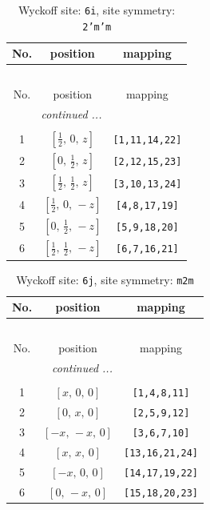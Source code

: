 \documentclass[fleqn,8pt]{jsarticle}
\begin{document}
\renewcommand{\arraystretch}{1.2}
\begin{longtable}{ccc}
\caption{Wyckoff site: {\tt 6i}, site symmetry: {\tt 2'm'm}}
 \\
 \hline \hline
No. & position & mapping \\ \hline \endfirsthead

\multicolumn{2}{l}{\tablename\ \thetable{}} \\
 \hline \hline
No. & position & mapping \\ \hline \endhead

 \hline \hline
\multicolumn{2}{r}{\footnotesize\it continued ...} \\ \endfoot

 \hline \hline
\multicolumn{2}{r}{} \\ \endlastfoot

1 & $\left[ \frac{1}{2},\, 0,\, z \right]$ & {\tt [1,11,14,22]} \\ \hline
2 & $\left[ 0,\, \frac{1}{2},\, z \right]$ & {\tt [2,12,15,23]} \\ \hline
3 & $\left[ \frac{1}{2},\, \frac{1}{2},\, z \right]$ & {\tt [3,10,13,24]} \\ \hline
4 & $\left[ \frac{1}{2},\, 0,\, - z \right]$ & {\tt [4,8,17,19]} \\ \hline
5 & $\left[ 0,\, \frac{1}{2},\, - z \right]$ & {\tt [5,9,18,20]} \\ \hline
6 & $\left[ \frac{1}{2},\, \frac{1}{2},\, - z \right]$ & {\tt [6,7,16,21]} \\
\end{longtable}
\renewcommand{\arraystretch}{1.2}
\begin{longtable}{ccc}
\caption{Wyckoff site: {\tt 6j}, site symmetry: {\tt m2m}}
 \\
 \hline \hline
No. & position & mapping \\ \hline \endfirsthead

\multicolumn{2}{l}{\tablename\ \thetable{}} \\
 \hline \hline
No. & position & mapping \\ \hline \endhead

 \hline \hline
\multicolumn{2}{r}{\footnotesize\it continued ...} \\ \endfoot

 \hline \hline
\multicolumn{2}{r}{} \\ \endlastfoot

1 & $\left[ x,\, 0,\, 0 \right]$ & {\tt [1,4,8,11]} \\ \hline
2 & $\left[ 0,\, x,\, 0 \right]$ & {\tt [2,5,9,12]} \\ \hline
3 & $\left[ - x,\, - x,\, 0 \right]$ & {\tt [3,6,7,10]} \\ \hline
4 & $\left[ x,\, x,\, 0 \right]$ & {\tt [13,16,21,24]} \\ \hline
5 & $\left[ - x,\, 0,\, 0 \right]$ & {\tt [14,17,19,22]} \\ \hline
6 & $\left[ 0,\, - x,\, 0 \right]$ & {\tt [15,18,20,23]} \\
\end{longtable}
\end{document}
